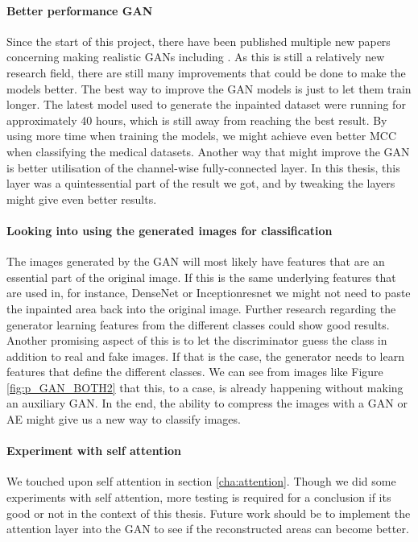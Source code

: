 \paragraph{Better performance GAN}
Since the start of this project, there have been published multiple new papers concerning making realistic GANs including \cite{DBLP:journals/corr/abs-1809-11096} \cite{DBLP:journals/corr/abs-1812-04948}. As this is still a relatively new research field, there are still many improvements that could be done to make the models better.
The best way to improve the GAN models is just to let them train longer. The latest model used to generate the inpainted dataset were running for approximately 40 hours, which is still away from reaching the best result. By using more time when training the models, we might achieve even better MCC when classifying the medical datasets.
Another way that might improve the GAN is better utilisation of the channel-wise fully-connected layer. In this thesis, this layer was a quintessential part of the result we got, and by tweaking the layers might give even better results.

\paragraph{Looking into using the generated images for classification}
The images generated by the GAN will most likely have features that are an essential part of the original image. If this is the same underlying features that are used in, for instance, DenseNet or Inceptionresnet we might not need to paste the inpainted area back into the original image.
Further research regarding the generator learning features from the different classes could show good results.
Another promising aspect of this is to let the discriminator guess the class in addition to real and fake images. If that is the case, the generator needs to learn features that define the different classes. We can see from images like Figure \ref{fig:p_GAN_BOTH2} that this, to a case, is already happening without making an auxiliary GAN.
In the end, the ability to compress the images with a GAN or AE might give us a new way to classify images.

\paragraph{Experiment with self attention}
We touched upon self attention in section \ref{cha:attention}. Though we did some experiments with self attention, more testing is required for a conclusion if its good or not in the context of this thesis. Future work should be to implement the attention layer into the GAN to see if the reconstructed areas can become better. 

